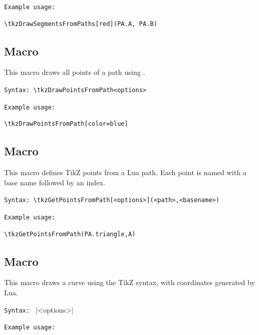 \texttt{Example usage: }

\begin{mybox}
\begin{verbatim}
\tkzDrawSegmentsFromPaths[red](PA.A, PA.B)
\end{verbatim}
\end{mybox}

\subsection{Macro }
\label{sub:macro_tkzDrawPointsFromPath}

This macro draws all points of a path using .

\texttt{Syntax: }\verb|\tkzDrawPointsFromPath<options>|


\texttt{Example usage: }

\begin{mybox}
\begin{verbatim}
\tkzDrawPointsFromPath[color=blue]
\end{verbatim}
\end{mybox}

\subsection{Macro }
This macro defines TikZ points from a Lua path. Each point is named with a base name followed by an index.

\texttt{Syntax: }\verb|\tkzGetPointsFromPath[<options>](<path>,<basename>)|

\texttt{Example usage: }

\begin{mybox}
\begin{verbatim}
\tkzGetPointsFromPath(PA.triangle,A)
\end{verbatim}
\end{mybox}

\subsection{Macro }
This macro draws a curve using the TikZ  syntax, with coordinates generated by Lua.


\texttt{Syntax: } |\tkzDrawCoordinates<options>|

\texttt{Example usage: }

